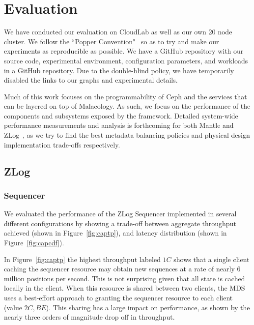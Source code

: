 \documentclass[10pt,twocolumn]{article}
\begin{document}
\section{Evaluation}\label{evaluation}
We have conducted our evaluation on CloudLab as well as our own 20 node cluster. We follow the ``Popper Convention"~\cite{} so as to try and make our experiments as reproducible as possible. We have a GitHub repository with our source code,  experimental environment, configuration parameters, and workloads in a GitHub repository. Due to the double-blind policy, we have temporarily disabled the links to our graphs and experimental details.

Much of this work focuses on the programmability of Ceph and the services that
can be layered on top of Malacology. As such, we focus on the performance of the 
components and subsystems exposed by the framework. Detailed system-wide performance
measurements and analysis is forthcoming for both Mantle and ZLog~\cite{}, as we try
to find the best metadata balancing policies and physical design implementation trade-offs
respectively.

\subsection{ZLog}

\subsubsection{Sequencer}

We evaluated the performance of the ZLog Sequencer implemented in several
different configurations by showing a trade-off between aggregate throughput
achieved (shown in Figure~\ref{fig:captp}), and latency distribution (shown in
Figure~\ref{fig:capcdf}).

In Figure~\ref{fig:captp} the highest throughput labeled $1C$ shows that a
single client caching the sequencer resource may obtain new sequences at a rate
of nearly 6 million positions per second. This is not surprising given that all
state is cached locally in the client. When this resource is shared between two
clients, the MDS uses a best-effort approach to granting the sequencer resource
to each client (value $2C,BE$). This sharing has a large impact on performance,
as shown by the nearly three orders of magnitude drop off in throughput.
\end{document}
